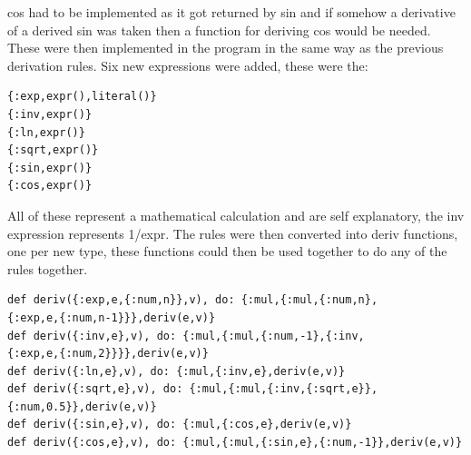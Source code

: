 \documentclass[a4paper,11pt]{article}
\begin{document}
\noindent
cos had to be implemented as it got returned by sin and if somehow a derivative of a derived sin was taken then a function for deriving cos would be needed. 
These were then implemented in the program in the same way as the previous derivation rules. Six new expressions were added, these were the:
\begin{verbatim}
{:exp,expr(),literal()}
{:inv,expr()}
{:ln,expr()}
{:sqrt,expr()}
{:sin,expr()}
{:cos,expr()}

\end{verbatim}
All of these represent a mathematical calculation and are self explanatory, the inv expression represents 1/expr. The rules were then converted into deriv functions, one per new type, these functions could then be used together to 
do any of the rules together. 
\begin{verbatim}
def deriv({:exp,e,{:num,n}},v), do: {:mul,{:mul,{:num,n},
{:exp,e,{:num,n-1}}},deriv(e,v)}
def deriv({:inv,e},v), do: {:mul,{:mul,{:num,-1},{:inv,
{:exp,e,{:num,2}}}},deriv(e,v)}
def deriv({:ln,e},v), do: {:mul,{:inv,e},deriv(e,v)}
def deriv({:sqrt,e},v), do: {:mul,{:mul,{:inv,{:sqrt,e}},{:num,0.5}},deriv(e,v)}
def deriv({:sin,e},v), do: {:mul,{:cos,e},deriv(e,v)}
def deriv({:cos,e},v), do: {:mul,{:mul,{:sin,e},{:num,-1}},deriv(e,v)}    
\end{verbatim}
\end{document}
